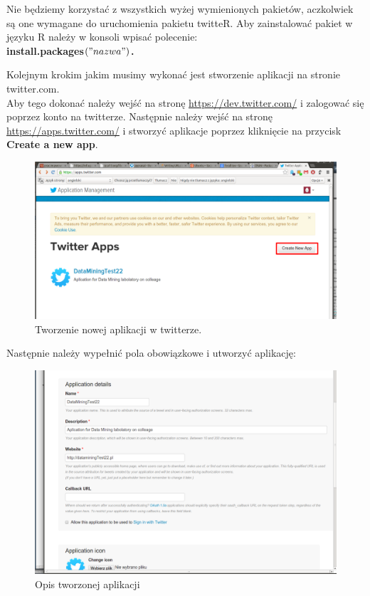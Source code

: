 \documentclass[12pt,a4paper]{article}
\begin{document}
Nie będziemy korzystać z wszystkich wyżej wymienionych pakietów, aczkolwiek są one wymagane do uruchomienia pakietu twitteR. 
Aby zainstalować pakiet w języku R należy w konsoli wpisać polecenie: \\ \textbf{install.packages$\left("nazwa"\right)$.}

Kolejnym krokim jakim musimy wykonać jest stworzenie aplikacji na stronie twitter.com. \\
Aby tego dokonać należy wejść na stronę \url{https://dev.twitter.com/} i zalogować się poprzez konto na twitterze. Następnie należy wejść na stronę \url{https://apps.twitter.com/} i stworzyć  aplikacje poprzez kliknięcie na przycisk \textbf{Create a new app}.

\begin{figure}[H]
\begin{center}
\includegraphics[scale=0.2]{pictures/Twitter1.png}
\caption{Tworzenie nowej aplikacji w twitterze.}
\end{center}
\end{figure}
Następnie należy wypełnić pola obowiązkowe i utworzyć aplikację: 
\begin{figure}[H]
\begin{center}
\includegraphics[scale=0.2]{pictures/Twitter2.png}
\caption{Opis tworzonej aplikacji}
\end{center}
\end{figure}
\end{document}
